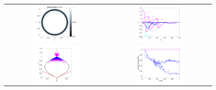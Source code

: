 \begin{figure}[H]
  \centering
  \begin{tabular}{cc}
    \includegraphics[width=0.495\textwidth]{figures/Implosion_Image} &
    \includegraphics[width=0.495\textwidth]{figures/Implosion_Lineout} \\
    \includegraphics[width=0.495\textwidth]{figures/Implosion_RealizableDomain} &
    \includegraphics[width=0.495\textwidth]{figures/Implosion_LimiterParameters}
  \end{tabular}

\end{figure}
